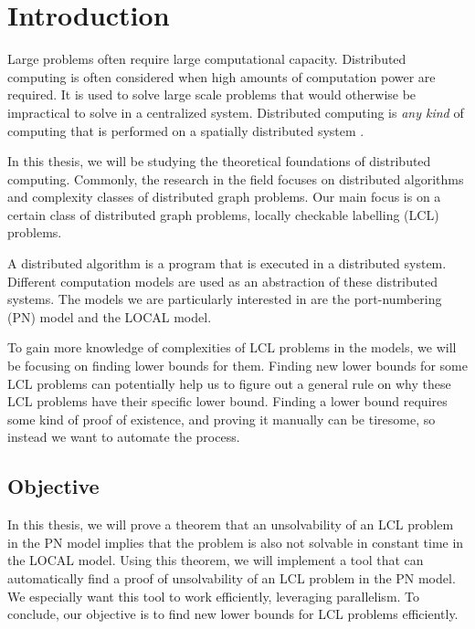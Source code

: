 
\section{Introduction}  \label{sec:introduction}

Large problems often require large computational capacity.
Distributed computing is often considered when high amounts of computation power are required.
It is used to solve large scale problems that would otherwise be impractical to solve in a centralized system.
Distributed computing is \emph{any kind} of computing that is performed on a spatially distributed system
\cite{DBLP:books/el/leeuwen90/LamportL90}.

In this thesis, we will be studying the theoretical foundations of distributed computing.
Commonly, the research in the field focuses on distributed algorithms and complexity classes of distributed graph problems.
Our main focus is on a certain class of distributed graph problems, locally checkable labelling (LCL) problems.

A distributed algorithm is a program that is executed in a distributed system.
Different computation models are used as an abstraction of these distributed systems.
The models we are particularly interested in are the port-numbering (PN) model and the LOCAL model.


To gain more knowledge of complexities of LCL problems in the models, we will be focusing on finding lower bounds for them.
Finding new lower bounds for some LCL problems can potentially help us to figure out a general rule on why these LCL problems have their specific lower bound.
Finding a lower bound requires some kind of proof of existence, and proving it manually can be tiresome, so instead we want to automate the process.

\subsection{Objective}
In this thesis, we will prove a theorem that an unsolvability of an LCL problem in the PN model implies that the problem is also not solvable in constant time in the LOCAL model.
Using this theorem, we will implement a tool that can automatically find a proof of unsolvability of an LCL problem in the PN model.
We especially want this tool to work efficiently, leveraging parallelism.
To conclude, our objective is to find new lower bounds for LCL problems efficiently.

